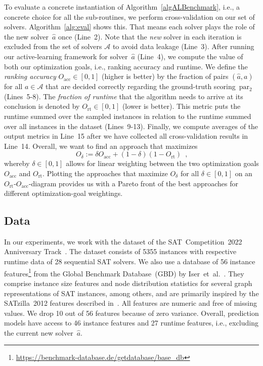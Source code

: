 \documentclass[sn-basic, Numbered]{sn-jnl} %
\begin{document}
To evaluate a concrete instantiation of Algorithm~\ref{algALBenchmark}, i.e., a concrete choice for all the sub-routines, we perform cross-validation on our set of solvers.
Algorithm~\ref{alg:eval} shows this.
That means each solver plays the role of the new solver~$\hat{a}$ once (Line~2).
Note that the \emph{new} solver in each iteration is excluded from the set of solvers $\mathcal{A}$ to avoid data leakage (Line~3).
After running our active-learning framework for solver~$\hat{a}$ (Line~4), we compute the value of both our optimization goals, i.e., ranking accuracy and runtime.
We define the \emph{ranking accuracy} $O_{\operatorname{acc}} \in \left[0, 1\right]$ (higher is better) by the fraction of pairs $\left(\hat{a}, a\right)$ for all $a \in \mathcal{A}$ that are decided correctly regarding the ground-truth scoring~$\operatorname{par_2}$ (Lines~5-8).
The \emph{fraction of runtime} that the algorithm needs to arrive at its conclusion is denoted by $O_{\operatorname{rt}} \in \left[0, 1\right]$ (lower is better).
This metric puts the runtime summed over the sampled instances in relation to the runtime summed over all instances in the dataset (Lines~9-13).
Finally, we compute averages of the output metrics in Line~15 after we have collected all cross-validation results in Line~14.
Overall, we want to find an approach that maximizes
%
\begin{equation}
  O_\delta := \delta O_{\operatorname{acc}} + \left(1 - \delta\right) \left(1 - O_{\operatorname{rt}}\right) \enspace \textrm{,}
  \label{eq:opt}
\end{equation} 
%
whereby $\delta \in \left[0, 1\right]$ allows for linear weighting between the two optimization goals $O_{\operatorname{acc}}$ and $O_{\operatorname{rt}}$.
Plotting the approaches that maximize $O_\delta$ for all $\delta \in \left[0, 1\right]$ on an $O_{\operatorname{rt}}$-$O_{\operatorname{acc}}$-diagram provides us with a Pareto front of the best approaches for different optimization-goal weightings.

\subsection{Data}
\label{sec:exdesign:data}

In our experiments, we work with the dataset of the SAT~Competition~2022 Anniversary Track~\cite{sat2022}.
The dataset consists of 5355 instances with respective runtime data of 28 sequential SAT solvers.
We also use a database of 56 instance features\footnote{\url{https://benchmark-database.de/getdatabase/base_db}} from the Global Benchmark Database~(GBD) by Iser~et~al.~\cite{IserS18}.
They comprise instance size features and node distribution statistics for several graph representations of SAT instances, among others, and are primarily inspired by the SATzilla~2012 features described in~\cite{features}.
All features are numeric and free of missing values.
We drop 10 out of 56 features because of zero variance.
Overall, prediction models have access to 46 instance features and 27 runtime features, i.e., excluding the current new solver~$\hat{a}$.
\end{document}
